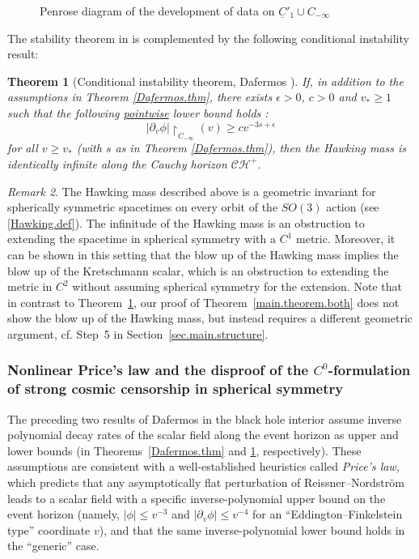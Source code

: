 \documentclass[10pt, reqno]{amsart}
\newtheorem{theorem}{Theorem}[section]
\theoremstyle{definition}
\theoremstyle{remark}
\newtheorem{remark}[theorem]{Remark}
\numberwithin{equation}{section}
\newcommand{\abs}[1]{\vert#1\vert}
\newcommand{\rd}{\partial}
\newcommand{\0}{\emptyset}
\begin{document}
\begin{figure}[htbp]
\begin{center}
\def\svgwidth{150px}
 
\caption{Penrose diagram of the development of data on $\underline{C}'_1\cup C_{-\infty}$} \label{fig:maintheorem}
\end{center}
\end{figure}


The stability theorem in \cite{D2} is complemented by the following conditional instability result:
\begin{theorem}[Conditional instability theorem, Dafermos \cite{D2}]\label{Dafermos.instability.thm}
If, in addition to the assumptions in Theorem \ref{Dafermos.thm}, there exists $\epsilon>0$, $c>0$ and $v_*\geq 1$ such that the following \underline{pointwise} lower bound holds  :
$$ |\rd_v\phi|\restriction_{C_{-\infty}}(v)\geq c v^{-3s+\epsilon} $$
for all $v\geq v_*$ (with $s$ as in Theorem \ref{Dafermos.thm}),
then the Hawking mass is identically infinite along the Cauchy horizon $\mathcal C\mathcal H^+$.
\end{theorem}

\begin{remark} \label{rem.hawking.mass}
The Hawking mass described above is a geometric invariant for spherically symmetric spacetimes on every orbit of the $SO(3)$ action (see \eqref{Hawking.def}). The infinitude of the Hawking mass is an obstruction to extending the spacetime in spherical symmetry with a $C^1$ metric. Moreover, it can be shown \cite{Kommemi} in this setting that the blow up of the Hawking mass implies the blow up of the Kretschmann scalar, which is an obstruction to extending the metric in $C^2$ without assuming spherical symmetry for the extension. Note that in contrast to Theorem~\ref{Dafermos.instability.thm}, our proof of Theorem~\ref{main.theorem.both} does not show the blow up of the Hawking mass, but instead requires a different geometric argument, cf. Step~5 in Section~\ref{sec.main.structure}.
\end{remark}


\subsubsection{Nonlinear Price's law and the disproof of the $C^{0}$-formulation of strong cosmic censorship in spherical symmetry}
The preceding two results of Dafermos in the black hole interior assume inverse polynomial decay rates of the scalar field along the event horizon as upper and lower bounds (in Theorems~\ref{Dafermos.thm} and \ref{Dafermos.instability.thm}, respectively). These assumptions are consistent with a well-established heuristics called \emph{Price's law}, which predicts that any asymptotically flat perturbation of Reissner--Nordstr\"om leads to a scalar field with a specific inverse-polynomial upper bound on the event horizon (namely, $\abs{\phi} \leq v^{-3}$ and $\abs{\rd_{v} \phi} \leq v^{-4}$ for an ``Eddington--Finkelstein type'' coordinate $v$), and that the same inverse-polynomial lower bound holds in the ``generic'' case.
\end{document}
